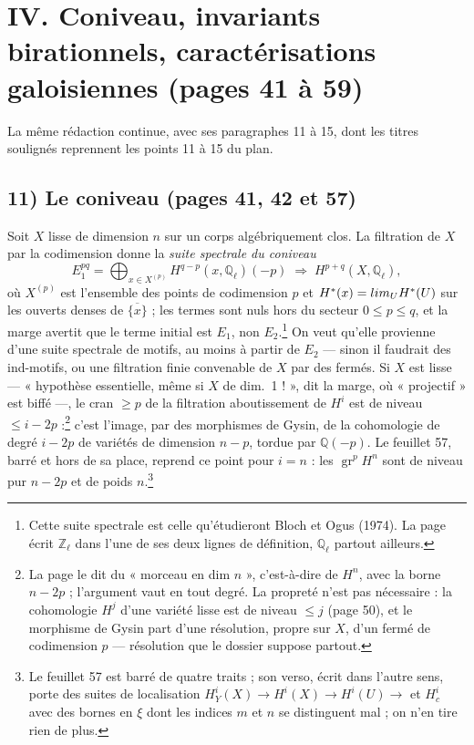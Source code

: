 \documentclass[11pt,a4paper]{article}
\begin{document}
\section*{IV. Coniveau, invariants birationnels, caractérisations galoisiennes (pages 41 à 59)}

La même rédaction continue, avec ses paragraphes 11 à 15, dont les titres
soulignés reprennent les points 11 à 15 du plan.

\subsection*{11) Le coniveau (pages 41, 42 et 57)}

Soit $X$ lisse de dimension $n$ sur un corps algébriquement clos. La filtration
de $X$ par la codimension donne la \emph{suite spectrale du coniveau}
\[
E_{1}^{pq} = \bigoplus_{x \in X^{(p)}} H^{q-p}(x, \mathbb{Q}_{\ell})(-p)
\;\Longrightarrow\; H^{p+q}(X, \mathbb{Q}_{\ell}) ,
\]
où $X^{(p)}$ est l'ensemble des points de codimension $p$ et $H^{*}(x) =
\varinjlim_{U} H^{*}(U)$ sur les ouverts denses de $\overline{\{x\}}$ ; les termes
sont nuls hors du secteur $0 \leqslant p \leqslant q$, et la marge avertit que le
terme initial est $E_{1}$, non $E_{2}$.\footnote{Cette suite spectrale est celle
qu'étudieront Bloch et Ogus (1974). La page écrit $\mathbb{Z}_{\ell}$ dans l'une de
ses deux lignes de définition, $\mathbb{Q}_{\ell}$ partout ailleurs.} On veut
qu'elle provienne d'une suite spectrale de motifs, au moins à partir de $E_{2}$ --- sinon
il faudrait des ind-motifs, ou une filtration finie convenable de $X$ par des fermés.
Si $X$ est lisse --- « hypothèse essentielle, même si $X$ de dim.\ 1 ! », dit la
marge, où « projectif » est biffé ---, le cran $\geqslant p$ de la filtration
aboutissement de $H^{i}$ est de niveau $\leqslant i-2p$ :\footnote{La page
le dit du « morceau en dim $n$ », c'est-à-dire de $H^{n}$, avec la borne
$n-2p$ ; l'argument vaut en tout degré. La propreté n'est pas nécessaire : la
cohomologie $H^{j}$ d'une variété lisse est de niveau $\leqslant j$ (page 50),
et le morphisme de Gysin part d'une résolution, propre sur $X$, d'un fermé de
codimension $p$ --- résolution que le dossier suppose partout.} c'est l'image, par des morphismes de Gysin, de la cohomologie
de degré $i-2p$ de variétés de dimension $n-p$, tordue par $\mathbb{Q}(-p)$. Le
feuillet 57, barré et hors de sa place, reprend ce point pour $i = n$ : les
$\operatorname{gr}^{p}H^{n}$ sont de niveau pur $n-2p$ et de poids
$n$.\footnote{Le feuillet 57 est barré de quatre traits ; son verso, écrit
dans l'autre sens, porte des suites de localisation $H^{i}_{Y}(X) \to H^{i}(X)
\to H^{i}(U) \to$ et $H^{i}_{c}$ avec des bornes en $\xi$ dont les indices
$m$ et $n$ se distinguent mal ; on n'en tire rien de plus.}
\end{document}
